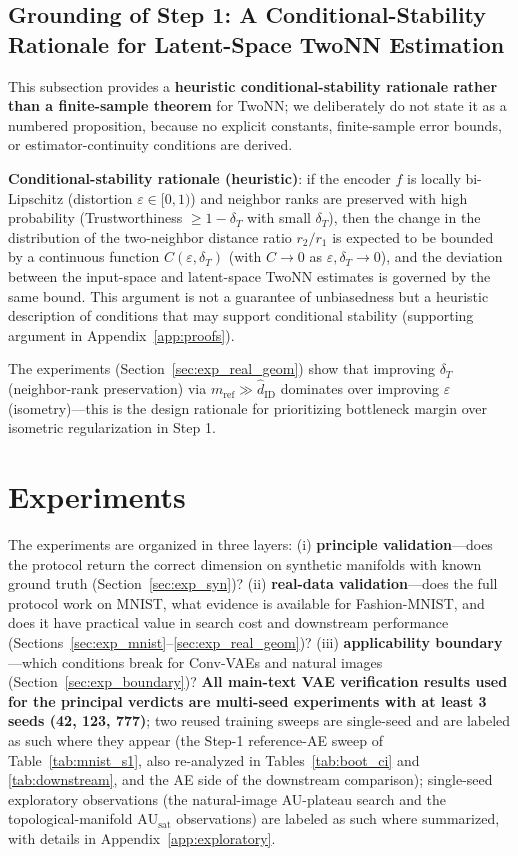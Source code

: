 \documentclass[make,article,submit,pdftex,moreauthors]{Definitions/mdpi}
\newcommand{\hatdID}{\hat{d}_{\mathrm{ID}}}
\newcommand{\AUsat}{\mathrm{AU}_{\mathrm{sat}}}
\begin{document}
\subsection{Grounding of Step 1: A Conditional-Stability Rationale for Latent-Space TwoNN Estimation}\label{sec:theory_twonn}

This subsection provides a \textbf{heuristic conditional-stability
rationale rather than a finite-sample theorem} for TwoNN; we deliberately
do not state it as a numbered proposition, because no explicit constants,
finite-sample error bounds, or estimator-continuity conditions are
derived.

\textbf{Conditional-stability rationale (heuristic)}:
if the encoder $f$ is locally bi-Lipschitz (distortion
$\varepsilon \in [0,1)$) and neighbor ranks are preserved with high
probability (Trustworthiness $\geq 1 - \delta_T$ with small $\delta_T$),
then the change in the distribution of the two-neighbor distance ratio
$r_2/r_1$ is expected to be bounded by a continuous function
$C(\varepsilon, \delta_T)$ (with $C \to 0$ as
$\varepsilon, \delta_T \to 0$), and the deviation between the input-space
and latent-space TwoNN estimates is governed by the same bound.
This argument is not a guarantee of unbiasedness but a heuristic
description of conditions that may support conditional stability
(supporting argument in
Appendix~\ref{app:proofs}).

The experiments (Section~\ref{sec:exp_real_geom}) show that improving
$\delta_T$ (neighbor-rank preservation) via $m_{\mathrm{ref}} \gg \hatdID$
dominates over improving $\varepsilon$ (isometry)---this is the design
rationale for prioritizing bottleneck margin over isometric regularization
in Step 1.

\section{Experiments}\label{sec:exp}

The experiments are organized in three layers:
(i) \textbf{principle validation}---does the protocol return the correct
dimension on synthetic manifolds with known ground truth
(Section~\ref{sec:exp_syn})?
(ii) \textbf{real-data validation}---does the full protocol work on MNIST,
what evidence is available for Fashion-MNIST, and does it have practical
value in search cost and downstream performance
(Sections~\ref{sec:exp_mnist}--\ref{sec:exp_real_geom})?
(iii) \textbf{applicability boundary}---which conditions break for
Conv-VAEs and natural images (Section~\ref{sec:exp_boundary})?
\textbf{All main-text VAE verification results used for the principal
verdicts are multi-seed experiments with at least 3 seeds (42, 123, 777)};
two reused training sweeps are single-seed and are labeled as such where
they appear (the Step-1 reference-AE sweep of Table~\ref{tab:mnist_s1},
also re-analyzed in Tables~\ref{tab:boot_ci} and \ref{tab:downstream}, and
the AE side of the downstream comparison); single-seed exploratory
observations (the natural-image AU-plateau search and the
topological-manifold $\AUsat$ observations) are labeled as such where
summarized, with details in Appendix~\ref{app:exploratory}.
\end{document}
